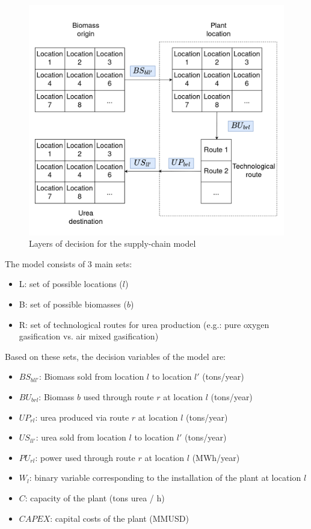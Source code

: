 \documentclass[a4paper, titlepage]{article}
\begin{document}
\begin{figure}
	\includegraphics[width=\textwidth]{img/layers_of_decision.png}
	\caption{Layers of decision for the supply-chain model}
	\label{img_layers}
\end{figure}

The model consists of 3 main sets:

\begin{itemize}
	\item L: set of possible locations ($l$)
	\item B: set of possible biomasses ($b$)
	\item R: set of technological routes for urea production (e.g.: pure oxygen gasification vs. air mixed gasification)
\end{itemize}

Based on these sets, the decision variables of the model are:

\begin{itemize}
	\item $BS_{bll'}$: Biomass sold from location $l$ to location $l'$ (tons/year)
	\item $BU_{brl}$: Biomass $b$ used through route $r$ at location $l$ (tons/year)
	\item $UP_{rl}$: urea produced via route $r$ at location $l$ (tons/year)
	\item $US_{ll'}$: urea sold from location $l$ to location $l'$ (tons/year)
	\item $PU_{rl}$: power used through route $r$ at location $l$ (MWh/year)
	\item $W_l$: binary variable corresponding to the installation of the plant at location $l$
	\item $C$: capacity of the plant (tons urea / h)
	\item $CAPEX$: capital costs of the plant (MMUSD)
\end{itemize}
\end{document}

